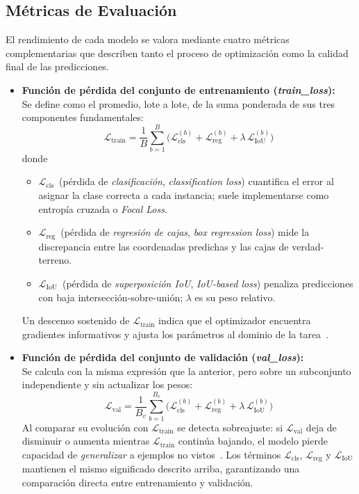 \subsection{Métricas de Evaluación}

El rendimiento de cada modelo se valora mediante cuatro métricas complementarias que describen tanto el proceso de optimización como la calidad final de las predicciones.

\begin{itemize}
    \item \textbf{Función de pérdida del conjunto de entrenamiento (\emph{train\_loss}):}\\[2pt]
      Se define como el promedio, lote a lote, de la suma ponderada de sus tres componentes fundamentales:
      \[
      \mathcal{L}_{\text{train}}
      =\frac{1}{B}\sum_{b=1}^{B}
        \bigl(
          \mathcal{L}_{\text{cls}}^{(b)}
          +\mathcal{L}_{\text{reg}}^{(b)}
          +\lambda\,\mathcal{L}_{\text{IoU}}^{(b)}
        \bigr)
      \]
      donde
      \begin{itemize}
        \item $\mathcal{L}_{\text{cls}}$ \,(pérdida de \textit{clasificación}, \emph{classification loss}) cuantifica el error al asignar la clase correcta a cada instancia; suele implementarse como entropía cruzada o \emph{Focal Loss}.
        \item $\mathcal{L}_{\text{reg}}$ \,(pérdida de \textit{regresión de cajas}, \emph{box regression loss}) mide la discrepancia entre las coordenadas predichas y las cajas de verdad‐terreno.
        \item $\mathcal{L}_{\text{IoU}}$ \,(pérdida de \textit{superposición IoU}, \emph{IoU-based loss}) penaliza predicciones con baja intersección-sobre-unión; $\lambda$ es su peso relativo.
      \end{itemize}
      Un descenso sostenido de $\mathcal{L}_{\text{train}}$ indica que el optimizador encuentra gradientes informativos y ajusta los parámetros al dominio de la tarea~\cite{goodfellow2016deep}.

    \item \textbf{Función de pérdida del conjunto de validación (\emph{val\_loss}):}\\[2pt]
      Se calcula con la misma expresión que la anterior, pero sobre un subconjunto independiente y sin actualizar los pesos:
      \[
      \mathcal{L}_{\text{val}}
      =\frac{1}{B_v}\sum_{b=1}^{B_v}
        \bigl(
          \mathcal{L}_{\text{cls}}^{(b)}
          +\mathcal{L}_{\text{reg}}^{(b)}
          +\lambda\,\mathcal{L}_{\text{IoU}}^{(b)}
        \bigr)
      \]
      Al comparar su evolución con $\mathcal{L}_{\text{train}}$ se detecta sobreajuste: si $\mathcal{L}_{\text{val}}$ deja de disminuir o aumenta mientras $\mathcal{L}_{\text{train}}$ continúa bajando, el modelo pierde capacidad de \emph{generalizar} a ejemplos no vistos~\cite{goodfellow2016deep}.
      Los términos $\mathcal{L}_{\text{cls}}$, $\mathcal{L}_{\text{reg}}$ y $\mathcal{L}_{\text{IoU}}$ mantienen el mismo significado descrito arriba, garantizando una comparación directa entre entrenamiento y validación.


\end{itemize}
